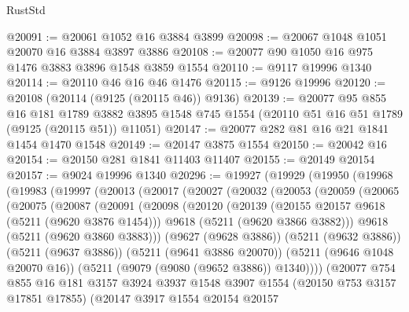 \begin{lexlean}{RustStd}
\begin{coremodule}
@20091 := @20061 @1052 @16 @3884 @3899
@20098 := @20067 @1048 @1051 @20070 @16 @3884 @3897 @3886
@20108 := @20077 @90 @1050 @16 @975 @1476 @3883 @3896 @1548 @3859 @1554
@20110 := @9117 @19996 @1340
@20114 := @20110 @46 @16 @46 @1476
@20115 := @9126 @19996
@20120 := @20108 (@20114 (@9125 (@20115 @46)) @9136)
@20139 := @20077
    @95
    @855
    @16
    @181
    @1789
    @3882
    @3895
    @1548
    @745
    @1554
    (@20110 @51 @16 @51 @1789 (@9125 (@20115 @51)) @11051)
@20147 := @20077 @282 @81 @16 @21 @1841 @1454 @1470 @1548
@20149 := @20147 @3875 @1554
@20150 := @20042 @16
@20154 := @20150 @281 @1841 @11403 @11407
@20155 := @20149 @20154
@20157 := @9024 @19996 @1340
@20296 := @19927
    (@19929
      (@19950
        (@19968
          (@19983
            (@19997
              (@20013
                (@20017
                  (@20027
                    (@20032
                      (@20053
                        (@20059
                          (@20065
                            (@20075
                              (@20087
                                (@20091
                                  (@20098
                                    (@20120
                                      (@20139
                                        (@20155 @20157 @9618 (@5211 (@9620 @3876 @1454)))
                                        @9618
                                        (@5211 (@9620 @3866 @3882)))
                                      @9618
                                      (@5211 (@9620 @3860 @3883)))
                                    (@9627 (@9628 @3886))
                                    (@5211 (@9632 @3886))
                                    (@5211 (@9637 @3886))
                                    (@5211 (@9641 @3886 @20070))
                                    (@5211 (@9646 @1048 @20070 @16))
                                    (@5211 (@9079 (@9080 (@9652 @3886)) @1340))))
                                (@20077
                                  @754
                                  @855
                                  @16
                                  @181
                                  @3157
                                  @3924
                                  @3937
                                  @1548
                                  @3907
                                  @1554
                                  (@20150 @753 @3157 @17851 @17855)
                                  (@20147
                                    @3917
                                    @1554
                                    @20154
                                    @20157

\end{coremodule}
\end{lexlean}
